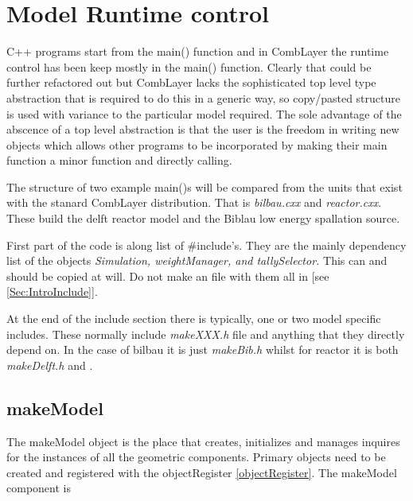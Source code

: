 
\section{Model Runtime control}

C++ programs start from the main() function and in CombLayer the
runtime control has been keep mostly in the main() function. Clearly
that could be further refactored out but CombLayer lacks the
sophisticated top level type abstraction that is required to do this
in a generic way, so copy/pasted structure is used with variance to
the particular model required. The sole advantage of the abscence of a
top level abstraction is that the user is the freedom in writing new objects
which allows other programs to be incorporated by making their main function
a minor function and directly calling.

The structure of two example main()s will be compared from the units
that exist with the stanard CombLayer distribution. That is {\it
bilbau.cxx} and {\it reactor.cxx}. These build the delft reactor model and the
Biblau low energy spallation source.

First part of the code is along list of \#include's. They are the
mainly dependency list of the objects {\it Simulation, weightManager,
and tallySelector.} This can and should be copied at will. Do not
make an file with them all in [see \ref{Sec:IntroInclude}].

At the end of the include section there is typically, one or two model
specific includes. These normally include {\it makeXXX.h} file and
anything that they directly depend on. In the case of bilbau it is just 
{\it makeBib.h} whilst for reactor it is both {\it makeDelft.h} and .

\subsection{makeModel}

The makeModel object is the place that creates, initializes and
manages inquires for the instances of all the geometric components. 
Primary objects need to be created and registered with the objectRegister 
\ref{objectRegister}. The makeModel component is 
 


